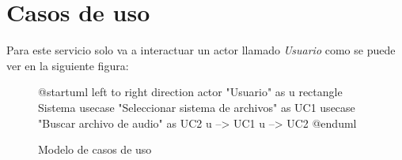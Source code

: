 
\section*{Casos de uso}

\noindent Para este servicio solo va a interactuar un actor llamado \emph{Usuario} como se puede ver
en la siguiente figura:

\begin{figure}[h]
	\centering
	\begin{plantuml}
		@startuml
		left to right direction
		actor "Usuario" as u
		rectangle Sistema {
			usecase "Seleccionar sistema de archivos" as UC1
			usecase "Buscar archivo de audio" as UC2
		}
		u --> UC1
		u --> UC2
		@enduml
	\end{plantuml}
	\caption{Modelo de casos de uso}
\end{figure}

